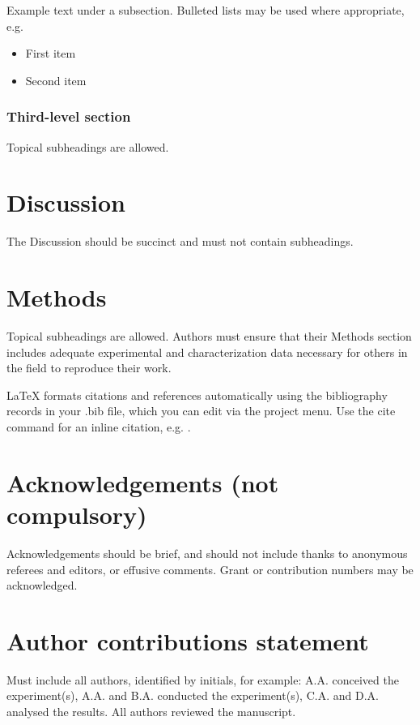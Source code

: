 \documentclass[fleqn,10pt]{wlscirep}
\begin{document}
Example text under a subsection. Bulleted lists may be used where appropriate, e.g.

\begin{itemize}
\item First item
\item Second item
\end{itemize}

\subsubsection*{Third-level section}
 
Topical subheadings are allowed.

\section*{Discussion}

The Discussion should be succinct and must not contain subheadings.

\section*{Methods}

Topical subheadings are allowed. Authors must ensure that their Methods section includes adequate experimental and characterization data necessary for others in the field to reproduce their work.



\noindent LaTeX formats citations and references automatically using the bibliography records in your .bib file, which you can edit via the project menu. Use the cite command for an inline citation, e.g.  \cite{Figueredo:2009dg}.

\section*{Acknowledgements (not compulsory)}

Acknowledgements should be brief, and should not include thanks to anonymous referees and editors, or effusive comments. Grant or contribution numbers may be acknowledged.

\section*{Author contributions statement}

Must include all authors, identified by initials, for example:
A.A. conceived the experiment(s),  A.A. and B.A. conducted the experiment(s), C.A. and D.A. analysed the results.  All authors reviewed the manuscript. 
\end{document}

